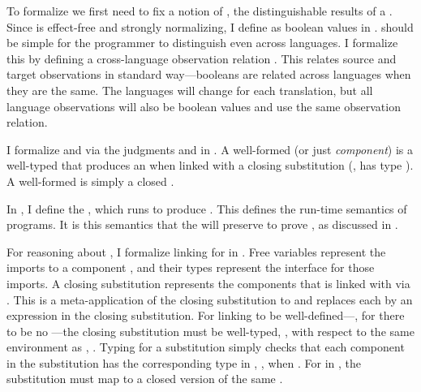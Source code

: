 \FigObs
To formalize  we first need to fix a notion of
, the
distinguishable results of  a .
Since \slang is effect-free and strongly normalizing, I define
 as boolean values in .
 should be simple for the programmer to distinguish even
across languages.
I formalize this by defining a cross-language observation relation \im{\approx}.
This relates source and target observations in standard way---booleans are
related across languages when they are the same.
The languages will change for each translation, but all language observations
will also be boolean values and use the same observation relation.

\FigECCProg[tbh]
I formalize  and  via the judgments
\im{\wf{}{\se}} and \im{\wf{\slenv}{\se}} in .
A well-formed  (or just \emph{component}) is a well-typed 
\im{\se} that produces an  when linked with a closing
substitution (\ie, has type \im{\sboolty}).
A well-formed  is simply a closed .

\FigECCEval[tbh]
In , I define the
\im{\seval{\se}}, which runs  to produce .
This defines the run-time semantics of \slang programs.
It is this semantics that the  will preserve to prove
, as discussed in .

\FigLinking[tbh]
For reasoning about , I formalize linking for \slang
in .
Free variables \im{\slenv} represent the imports to a component \im{\se}, and
their types represent the interface for those imports.
A closing substitution \im{\ssubst} represents the components that \im{\se} is
linked with via \im{\ssubst(\se)}.
This is a meta-application of the closing substitution to \im{\se} and replaces
each \im{\sx \in \slenv} by an expression \im{\ssubst{\sx}} in the closing
substitution.
For linking to be well-defined---\ie, for there to be no ---the closing \im{\ssubst} substitution must be well-typed,
\im{\wf{\slenv}{\ssubst}}, with respect to the same environment as \im{\se},
\im{\styjudg{\slenv}{\se}{\sA}}.
Typing for a substitution \im{\ssubst} simply checks that each component
\im{[\sx \mapsto \sepr] \in \ssubst} in the substitution has the corresponding
type in \im{\slenv}, \ie, \im{\sepr : \sA} when \im{\sx : \sA \in \slenv}.
For  in \im{\slenv}, the substitution must map to a closed version of
the same .
